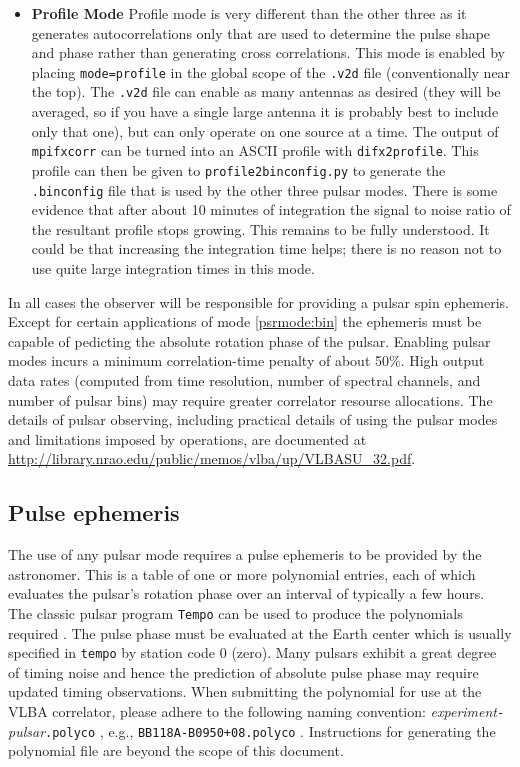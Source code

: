 \begin{itemize}
\item \label{psrmode:profile} {\bf Profile Mode}
Profile mode is very different than the other three as it generates autocorrelations only that are used to determine the pulse shape and phase rather than generating cross correlations.
This mode is enabled by placing {\tt mode=profile} in the global scope of the {\tt .v2d} file (conventionally near the top).
The {\tt .v2d} file can enable as many antennas as desired (they will be averaged, so if you have a single large antenna it is probably best to include only that one), but can only operate on one source at a time.
The output of {\tt mpifxcorr} can be turned into an ASCII profile with {\tt difx2profile}.
This profile can then be given to {\tt profile2binconfig.py} to generate the {\tt .binconfig} file that is used by the other three pulsar modes.
There is some evidence that after about 10 minutes of integration the signal to noise ratio of the resultant profile stops growing.
This remains to be fully understood.
It could be that increasing the integration time helps; there is no reason not to use quite large integration times in this mode.

\end{itemize}

In all cases the observer will be responsible for providing a pulsar
spin ephemeris.  Except for certain applications of mode 
\ref{psrmode:bin} the ephemeris must be capable of pedicting the absolute
rotation phase of the pulsar.
Enabling pulsar modes incurs a minimum correlation-time penalty of
about 50\%.  High output data rates (computed from time resolution,
number of spectral channels, and number of pulsar bins) may require 
greater correlator resourse allocations.
The details of pulsar observing, including practical details of using
the pulsar modes and limitations imposed by operations, 
are documented at \url{http://library.nrao.edu/public/memos/vlba/up/VLBASU_32.pdf}.

\subsection{Pulse ephemeris}

The use of any pulsar mode requires a pulse ephemeris to be provided by the astronomer.  
This is a table of one or more polynomial entries, each of which evaluates the pulsar's rotation phase over an interval of typically a few hours.
The classic pulsar program {\tt Tempo} can be used to produce the polynomials required \cite{tempo}.
The pulse phase must be evaluated at the Earth center which is usually specified in {\tt tempo} by station code 0 (zero).
Many pulsars exhibit a great degree of timing noise and hence the prediction of absolute pulse phase may require updated timing observations.
When submitting the polynomial for use at the VLBA correlator, please adhere to the following naming convention: {\em experiment}{\tt -}{\em pulsar}{\tt .polyco} , e.g., {\tt BB118A-B0950+08.polyco} .
Instructions for generating the polynomial file are beyond the scope of this document.

